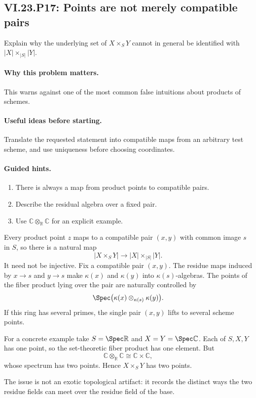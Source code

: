 \subsection*{VI.23.P17: Points are not merely compatible pairs}
\begin{problem}\label{prob:vi23-p17}
Explain why the underlying set of $X\times_SY$ cannot in general be identified with
$|X|\times_{|S|}|Y|$.
\end{problem}

\ifdefined\FullProblemDossiers
\paragraph{Why this problem matters.}
This warns against one of the most common false intuitions about products of schemes.

\paragraph{Useful ideas before starting.}
Translate the requested statement into compatible maps from an arbitrary test scheme, and use uniqueness before choosing coordinates.

\paragraph{Guided hints.}
\begin{enumerate}
\item There is always a map from product points to compatible pairs.
\item Describe the residual algebra over a fixed pair.
\item Use $\mathbb C\otimes_{\mathbb R}\mathbb C$ for an explicit example.
\end{enumerate}

\begin{solution}
Every product point $z$ maps to a compatible pair $(x,y)$ with common image $s$ in $S$, so
there is a natural map
\[
|X\times_SY|\longrightarrow |X|\times_{|S|}|Y|.
\]
It need not be injective.  Fix a compatible pair $(x,y)$.  The residue maps induced by
$x\to s$ and $y\to s$ make $\kappa(x)$ and $\kappa(y)$ into $\kappa(s)$-algebras.  The points
of the fiber product lying over the pair are naturally controlled by
\[
\Spec\bigl(\kappa(x)\otimes_{\kappa(s)}\kappa(y)\bigr).
\]
If this ring has several primes, the single pair $(x,y)$ lifts to several scheme points.

For a concrete example take $S=\Spec\mathbb R$ and
$X=Y=\Spec\mathbb C$.  Each of $S,X,Y$ has one point, so the set-theoretic fiber product has
one element.  But
\[
\mathbb C\otimes_{\mathbb R}\mathbb C\cong\mathbb C\times\mathbb C,
\]
whose spectrum has two points.  Hence $X\times_SY$ has two points.

The issue is not an exotic topological artifact: it records the distinct ways the two residue
fields can meet over the residue field of the base.
\end{solution}

